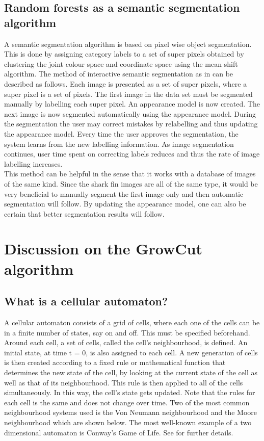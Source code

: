 \documentclass[a4paper,10pt]{article}
\begin{document}
\subsection{Random forests as a semantic segmentation algorithm}
A semantic segmentation algorithm is based on pixel wise object segmentation.  This is done by assigning category labels to a set of super pixels obtained by clustering the joint colour space and coordinate space using the mean shift algorithm.
The method of interactive semantic segmentation as in \cite{RF} can be described as follows.  Each image is presented as a set of super pixels, where a super pixel is a set of pixels.  The first image in the data set must be segmented manually by labelling each super pixel.  An appearance model is now created.  The next image is now segmented automatically using the appearance model.  During the segmentation the user may correct mistakes by relabelling and thus updating the appearance model.  Every time the user approves the segmentation, the system learns from the new labelling information. As image segmentation continues, user time spent on correcting labels reduces and thus the rate of image labelling increases.  \\

\noindent This method can be helpful in the sense that it works with a database of images of the same kind.  Since the shark fin images are all of the same type, it would be very beneficial to manually segment the first image only and then automatic segmentation will follow.  By updating the appearance model, one can also be certain that better segmentation results will follow.  \\  

\section{Discussion on the GrowCut algorithm}
\subsection{What is a cellular automaton?}
A cellular automaton consists of a grid of cells, where each one of the cells can be in a finite number of states, say on and off.  This must be specified beforehand.  Around each cell, a set of cells, called the cell's neighbourhood, is defined.  An initial state, at time t = 0, is also assigned to each cell.  A new generation of cells is then created according to a fixed rule or mathematical function that determines the new state of the cell, by looking at the current state of the cell as well as that of its neighbourhood.  This rule is then applied to all of the cells simultaneously.  In this way, the cell's state gets updated.  Note that the rules for each cell is the same and does not change over time.  Two of the most common neighbourhood systems used is the Von Neumann neighbourhood and the Moore neighbourhood which are shown below.  The most well-known example of a two dimensional automaton is Conway's Game of Life.  See \cite{gol} for further details.
\end{document}

